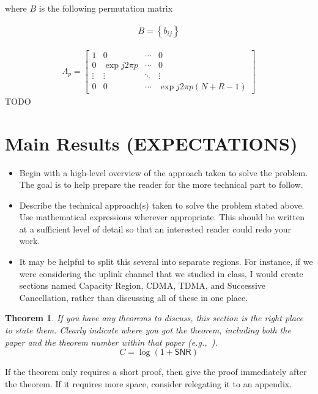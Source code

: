 \documentclass[article,11pt,onecolumn,final]{IEEEtran}
\newtheorem{theorem}{Theorem}
\begin{document}
where $B$ is the following permutation matrix

\begin{align*}
B = \left \{b_{ij} \right \} 
\end{align*}

\begin{align*}
\Lambda_p = 
	\begin{bmatrix}
	 1			&		0				&		\cdots		&		0 \\
	 0			&		\exp{j2\pi p}	&		\cdots		&		0 \\
	 \vdots 	&		\vdots			&		\ddots		&		\vdots \\
	 0			&		0				&		\cdots		&		\exp{j2\pi p(N + R - 1)}
	\end{bmatrix}
\end{align*}
TODO

\section{Main Results (EXPECTATIONS)}
\begin{itemize}

\item Begin with a high-level overview of the approach taken to solve the problem. The goal is to help prepare the reader for the more technical part to follow.

\item Describe the technical approach(s) taken to solve the problem stated above. Use mathematical expressions wherever appropriate. This should be written at a sufficient level of detail so that an interested reader could redo your work.

\item It may be helpful to split this several into separate regions. For instance, if we were considering the uplink channel that we studied in class, I would create sections named Capacity Region, CDMA, TDMA, and Successive Cancellation, rather than discussing all of these in one place. 

\end{itemize} 

\begin{theorem}
If you have any theorems to discuss, this section is the right place to state them. Clearly indicate where you got the theorem, including both the paper and the theorem number within that paper (e.g.,~\cite[Theorem 2]{Shannon1948}).
\begin{equation}
C = \log(1 + \mathsf{SNR}) \label{e:capacity}
\end{equation}
\end{theorem}
\begin{IEEEproof}
If the theorem only requires a short proof, then give the proof immediately after the theorem. If it requires more space, consider relegating it to an appendix. 
\end{IEEEproof}
\end{document}
